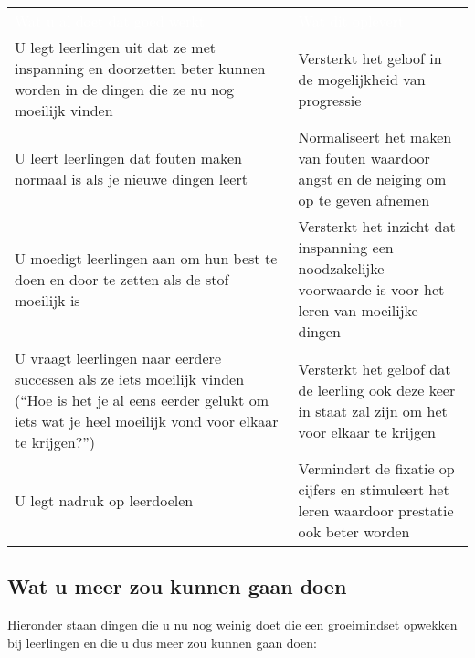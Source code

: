 \documentclass{article}
\begin{document}
\begin{table}[h!]
\centering
\begin{tabular}{>{\hspace{0pt}}p{0.61\linewidth}>{\hspace{0pt}}p{0.385\linewidth}}
\rowcolor[rgb]{0.161,0.231,0.565}  \textcolor{white}{Wat u al doet dat goed werkt }                                                                                                                        & \textcolor{white}{Wat dit oplevert }                                                                      \\
\rowcolor[rgb]{0.949,0.949,0.949} U legt leerlingen uit dat ze met inspanning en doorzetten beter kunnen worden in de dingen die ze nu nog moeilijk vinden                                                 & Versterkt het geloof in de mogelijkheid van progressie                                                    \\
\rowcolor[rgb]{0.949,0.949,0.949} U leert leerlingen dat fouten maken normaal is als je nieuwe dingen leert                                                                                                & Normaliseert het maken van fouten waardoor angst en de neiging om op te geven afnemen                     \\
\rowcolor[rgb]{0.949,0.949,0.949} U moedigt leerlingen aan om hun best te doen en door te zetten als de stof moeilijk is                                                                                   & Versterkt het inzicht dat inspanning een noodzakelijke voorwaarde is voor het leren van moeilijke dingen  \\
\rowcolor[rgb]{0.949,0.949,0.949} U vraagt leerlingen naar eerdere successen als ze iets moeilijk vinden (“Hoe is het je al eens eerder gelukt om iets wat je heel moeilijk vond voor elkaar te krijgen?”) & Versterkt het geloof dat de leerling ook deze keer in staat zal zijn om het voor elkaar te krijgen        \\
\rowcolor[rgb]{0.949,0.949,0.949} U legt nadruk op leerdoelen                                                                                                                                              & Vermindert de fixatie op cijfers en stimuleert het leren waardoor prestatie ook beter worden
\end{tabular}
\end{table}




\subsection{Wat u meer zou kunnen gaan doen}
Hieronder staan dingen die u nu nog weinig doet die een groeimindset opwekken bij leerlingen en die u dus meer zou kunnen gaan doen:
\end{document}
